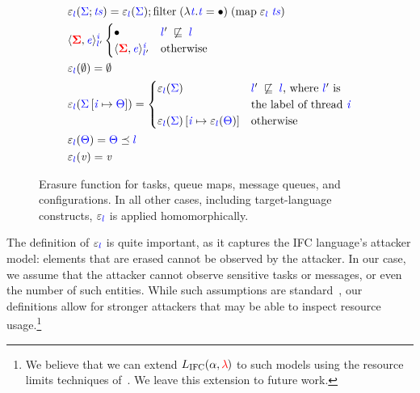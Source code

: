 \documentclass{sigplanconf}
\newcommand{\Varid}[1]{\mathit{#1}}
\newcommand{\Red}[1]{{\color{red} #1}}
\begin{document}
\begin{figure} %
\begin{align*}
  &\ensuremath{\varepsilon_{\ifc{l}}(\ifc{\Sigma};\ifc{\Varid{ts}})\mathrel{=}\varepsilon_{\ifc{l}}(\ifc{\Sigma});\text{filter}\;(\lambda \ifc{\Varid{t}}.\ifc{\Varid{t}}\mathrel{=}\bullet)\;(\text{map}\;\varepsilon_{\ifc{l}}\;\ifc{\Varid{ts}})}\\
  &\ensuremath{\langle \tar{\Sigma}, \ifc{\Varid{e}}\rangle^{\ifc{\Varid{i}}}_{\ifc{l}'}} \begin{cases}
    \ensuremath{\bullet} & \ensuremath{\ifc{l}'\;\not\flows{}\;\ifc{l}} \\
    \ensuremath{\langle \tar{\Sigma}, \ifc{\Varid{e}}\rangle^{\ifc{\Varid{i}}}_{\ifc{l}'}} & \text{otherwise}
  \end{cases} \\
  &\ensuremath{\varepsilon_{\ifc{l}}(\emptyset)\mathrel{=}\emptyset}\\
  &\ensuremath{\varepsilon_{\ifc{l}}(\ifc{\Sigma}\left[\ifc{\Varid{i}}\mapsto{}\ifc{\Theta}\right])\mathrel{=}} \begin{cases}
    \ensuremath{\varepsilon_{\ifc{l}}(\ifc{\Sigma})} & \text{\ensuremath{\ifc{l}'\;\not\flows{}\;\ifc{l}}, where \ensuremath{\ifc{l}'} is}\\
    & \text{the label of thread \ensuremath{\ifc{\Varid{i}}}} \\
    \ensuremath{\varepsilon_{\ifc{l}}(\ifc{\Sigma})\left[\ifc{\Varid{i}}\mapsto{}\varepsilon_{\ifc{l}}(\ifc{\Theta})\right]} & \text{otherwise}
  \end{cases} \\
  &\ensuremath{\varepsilon_{\ifc{l}}(\ifc{\Theta})\mathrel{=}\ifc{\Theta}\preceq\ifc{l}}\\
  &\ensuremath{\varepsilon_{\ifc{l}}(\Varid{v})\mathrel{=}\Varid{v}}
\end{align*}
\caption{ Erasure function for tasks, queue maps, message queues, and
configurations.  In all other cases, including target-language constructs,
\ensuremath{\varepsilon_{\ifc{l}}} is applied homomorphically.  \label{fig:erasure} }
\end{figure}

The definition of \ensuremath{\varepsilon_{\ifc{l}}} is quite important, as it captures the IFC
language's attacker model: elements that are erased cannot be observed
by the attacker.
%
In our case, we assume that the attacker cannot observe sensitive tasks or
messages, or even the number of such entities.
%
While such assumptions are standard~\cite{Castellani:Boudol:ICALP01,
stefan:addressing-covert}, our definitions allow for
stronger attackers that may be able to inspect resource usage.\footnote{
  We believe that we can extend \ensuremath{L_\text{IFC}(\alpha,\Red{\lambda}\;\!\!)} to
  such models using the resource limits techniques of~\cite{yangresource}.
  We leave this extension to future work.
}
\end{document}
